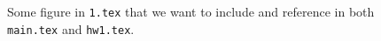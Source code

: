 \documentclass{article}
\begin{document}
\ExplSyntaxOn
{}
\ExplSyntaxOff
\begin{figure}[htbp]
    \centering
    \caption{Some figure in \texttt{1.tex} that we want to include and reference in both \texttt{main.tex} and \texttt{hw1.tex}.}
    \label{fig:1}
\end{figure}
\end{document}
